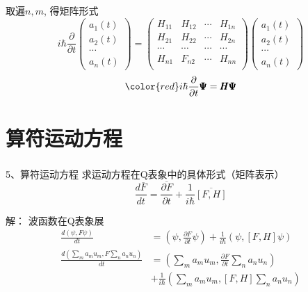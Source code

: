 \begin{frame} 
    取遍$n,m$, 得矩阵形式\\ 
    $$i\hbar \frac{\partial}{\partial t }  
    \begin{pmatrix}
        a_1(t)\\
        a_2(t)\\
        \cdots \\
        a_n(t)
    \end{pmatrix}
    =         
    \begin{pmatrix}
        H_{11} & H_{12} & \cdots & H_{1n} \\
        H_{21} & H_{22} & \cdots & H_{2n} \\
        \cdots & \cdots &  \cdots& \cdots\\
        H_{n1} & F_{n2} & \cdots & H_{nn} \\
     \end{pmatrix}
     \begin{pmatrix}
         a_1(t)\\
         a_2(t)\\
         \cdots \\
         a_n(t)
     \end{pmatrix}
    $$ \vspace{0.6em }
    $$\color{red} i\hbar \frac{\partial}{\partial t }  \pmb \Psi = \pmb H  \pmb \Psi $$
\end{frame}

\section{算符运动方程}
\begin{frame} 
    \frametitle{}
    \begin{tcolorbox1}{5、算符运动方程}
        求运动方程在Q表象中的具体形式（矩阵表示）
        $$ \frac{d\overline{F}}{dt}=\overline{\frac{\partial F }{\partial t}}  +\frac{1}{i\hbar} \overline{[F,H]}$$
    \end{tcolorbox1}
    \alert{解：} 波函数在Q表象展
    \begin{equation*}
        \begin{split}
            \frac{d(\psi,F \psi )}{dt} &=(\psi,\frac{\partial F }{\partial t} \psi)  +\frac{1}{i\hbar}  ( \psi,[F,H]\psi) \\
            \frac{d(\sum_m a_m u_m,F \sum_n a_n u_n )}{dt} &=(\sum_m a_m u_m,\frac{\partial F }{\partial t} \sum_n a_n u_n) \\  
            &+\frac{1}{i\hbar}  (\sum_m a_m u_m,[F,H]\sum_n a_n u_n)  \\    
        \end{split} 
    \end{equation*}
\end{frame}

